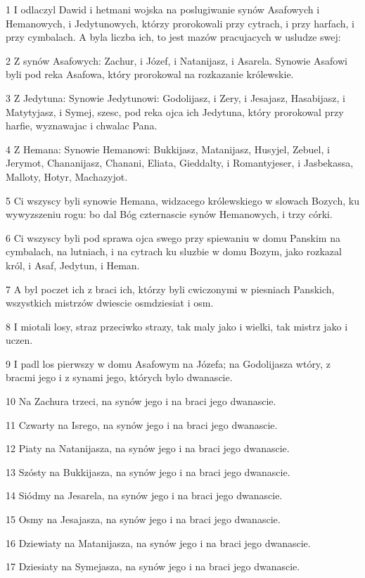 \par 1 I odlaczyl Dawid i hetmani wojska na poslugiwanie synów Asafowych i Hemanowych, i Jedytunowych, którzy prorokowali przy cytrach, i przy harfach, i przy cymbalach. A byla liczba ich, to jest mazów pracujacych w usludze swej:
\par 2 Z synów Asafowych: Zachur, i Józef, i Natanijasz, i Asarela. Synowie Asafowi byli pod reka Asafowa, który prorokowal na rozkazanie królewskie.
\par 3 Z Jedytuna: Synowie Jedytunowi: Godolijasz, i Zery, i Jesajasz, Hasabijasz, i Matytyjasz, i Symej, szesc, pod reka ojca ich Jedytuna, który prorokowal przy harfie, wyznawajac i chwalac Pana.
\par 4 Z Hemana: Synowie Hemanowi: Bukkijasz, Matanijasz, Husyjel, Zebuel, i Jerymot, Chananijasz, Chanani, Eliata, Gieddalty, i Romantyjeser, i Jasbekassa, Malloty, Hotyr, Machazyjot.
\par 5 Ci wszyscy byli synowie Hemana, widzacego królewskiego w slowach Bozych, ku wywyzszeniu rogu: bo dal Bóg czternascie synów Hemanowych, i trzy córki.
\par 6 Ci wszyscy byli pod sprawa ojca swego przy spiewaniu w domu Panskim na cymbalach, na lutniach, i na cytrach ku sluzbie w domu Bozym, jako rozkazal król, i Asaf, Jedytun, i Heman.
\par 7 A byl poczet ich z braci ich, którzy byli cwiczonymi w piesniach Panskich, wszystkich mistrzów dwiescie osmdziesiat i osm.
\par 8 I miotali losy, straz przeciwko strazy, tak maly jako i wielki, tak mistrz jako i uczen.
\par 9 I padl los pierwszy w domu Asafowym na Józefa; na Godolijasza wtóry, z bracmi jego i z synami jego, których bylo dwanascie.
\par 10 Na Zachura trzeci, na synów jego i na braci jego dwanascie.
\par 11 Czwarty na Isrego, na synów jego i na braci jego dwanascie.
\par 12 Piaty na Natanijasza, na synów jego i na braci jego dwanascie.
\par 13 Szósty na Bukkijasza, na synów jego i na braci jego dwanascie.
\par 14 Siódmy na Jesarela, na synów jego i na braci jego dwanascie.
\par 15 Osmy na Jesajasza, na synów jego i na braci jego dwanascie.
\par 16 Dziewiaty na Matanijasza, na synów jego i na braci jego dwanascie.
\par 17 Dziesiaty na Symejasza, na synów jego i na braci jego dwanascie.

